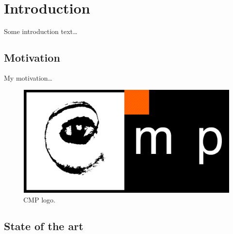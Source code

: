 %

\chapter{Introduction}
Some introduction text\dots

\section{Motivation}
My motivation\dots
\begin{figure}
  \centering
  \includegraphics[width=.6\LW]{images/cmp}
  \caption{CMP logo.}
  \label{fig:cmp}
\end{figure}



\section{State of the art}



